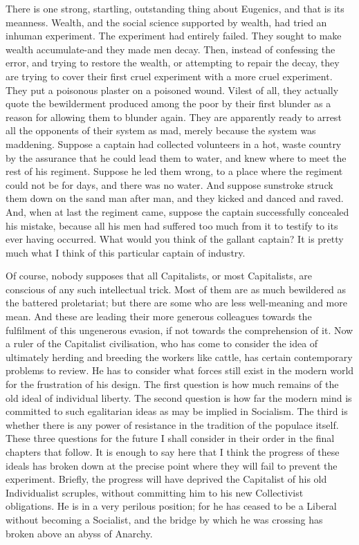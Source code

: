 \documentclass{book}
\begin{document}
There is one strong, startling, outstanding thing about Eugenics, and that is its meanness. Wealth, and the social science supported by wealth, had tried an inhuman experiment. The experiment had entirely failed. They sought to make wealth accumulate-and they made men decay. Then, instead of confessing the error, and trying to restore the wealth, or attempting to repair the decay, they are trying to cover their first cruel experiment with a more cruel experiment. They put a poisonous plaster on a poisoned wound. Vilest of all, they actually quote the bewilderment produced among the poor by their first blunder as a reason for allowing them to blunder again. They are apparently ready to arrest all the opponents of their system as mad, merely because the system was maddening. Suppose a captain had collected volunteers in a hot, waste country by the assurance that he could lead them to water, and knew where to meet the rest of his regiment. Suppose he led them wrong, to a place where the regiment could not be for days, and there was no water. And suppose sunstroke struck them down on the sand man after man, and they kicked and danced and raved. And, when at last the regiment came, suppose the captain successfully concealed his mistake, because all his men had suffered too much from it to testify to its ever having occurred. What would you think of the gallant captain? It is pretty much what I think of this particular captain of industry.

Of course, nobody supposes that all Capitalists, or most Capitalists, are conscious of any such intellectual trick. Most of them are as much bewildered as the battered proletariat; but there are some who are less well-meaning and more mean. And these are leading their more generous colleagues towards the fulfilment of this ungenerous evasion, if not towards the comprehension of it. Now a ruler of the Capitalist civilisation, who has come to consider the idea of ultimately herding and breeding the workers like cattle, has certain contemporary problems to review. He has to consider what forces still exist in the modern world for the frustration of his design. The first question is how much remains of the old ideal of individual liberty. The second question is how far the modern mind is committed to such egalitarian ideas as may be implied in Socialism. The third is whether there is any power of resistance in the tradition of the populace itself. These three questions for the future I shall consider in their order in the final chapters that follow. It is enough to say here that I think the progress of these ideals has broken down at the precise point where they will fail to prevent the experiment. Briefly, the progress will have deprived the Capitalist of his old Individualist scruples, without committing him to his new Collectivist obligations. He is in a very perilous position; for he has ceased to be a Liberal without becoming a Socialist, and the bridge by which he was crossing has broken above an abyss of Anarchy.
\end{document}
